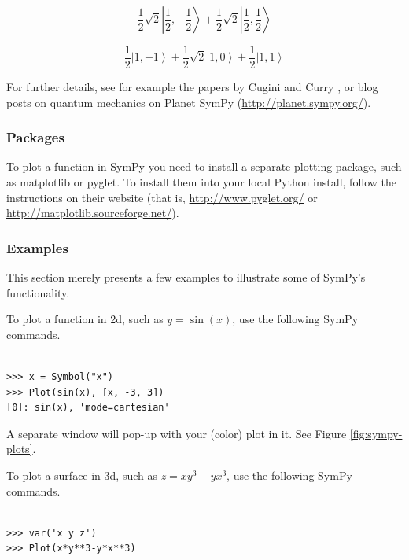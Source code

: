 \documentclass[12pt]{article}
\begin{document}
\[
\frac{1}{2} \sqrt{2} {\left|\frac{1}{2},- \frac{1}{2}\right\rangle } + \frac{1
}{2} \sqrt{2} {\left|\frac{1}{2},\frac{1}{2}\right\rangle }
\]

\[
\frac{1}{2} {\left|1,-1\right\rangle } + \frac{1}{2} \sqrt{2} {\left|1,0\right
\rangle } + \frac{1}{2} {\left|1,1\right\rangle }
\]

For further details, see for example the papers by Cugini \cite{Cug}
and Curry \cite{Cur}, or blog posts on quantum mechanics on 
Planet SymPy (\url{http://planet.sympy.org/}).

\subsubsection{Packages}

To plot a function in SymPy you need to install a separate plotting
package, such as matplotlib or pyglet.
To install them into your local Python install, follow the
instructions on their website (that is,
\url{http://www.pyglet.org/} or
\url{http://matplotlib.sourceforge.net/}).

\subsubsection{Examples}

This section merely presents a few examples to illustrate some of 
SymPy's functionality.

To plot a function in 2d, such as $y=\sin(x)$,
use the following SymPy commands.

\begin{Verbatim}[fontsize=\scriptsize,fontfamily=courier,fontshape=tt,frame=single,label=SymPy]

>>> x = Symbol("x")
>>> Plot(sin(x), [x, -3, 3])
[0]: sin(x), 'mode=cartesian'

\end{Verbatim}

\noindent
A separate window will pop-up with your (color) plot in it.
See Figure \ref{fig:sympy-plots}.

To plot a surface in 3d, such as $z=xy^3-yx^3$,
use the following SymPy commands.

\begin{Verbatim}[fontsize=\scriptsize,fontfamily=courier,fontshape=tt,frame=single,label=SymPy]

>>> var('x y z')
>>> Plot(x*y**3-y*x**3)

\end{Verbatim}
\end{document}
